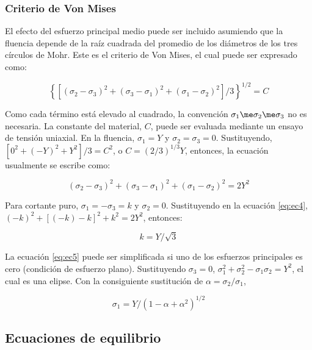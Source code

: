 \subsubsection{Criterio de Von Mises}

El efecto del esfuerzo principal medio puede ser incluido asumiendo que la fluencia depende de la raíz cuadrada 
del promedio de los diámetros de los tres círculos de Mohr. Este es el criterio de Von Mises, el cual puede ser 
expresado como:

\begin{equation} \label{eq:ec3}
\left\{ [(\sigma_2-\sigma_3)^2 + (\sigma_3-\sigma_1 )^2 + (\sigma_1-\sigma_2 )^2]/3 \right\}^{1/2} = C
\end{equation}

Como cada término está elevado al cuadrado, la convención $\sigma_1 \me \sigma_2 \me \sigma_3$ no es necesaria. 
La constante del material, $C$, puede ser evaluada mediante un ensayo de tensión uniaxial. En la fluencia, 
$\sigma_1 = Y$ y $\sigma_2 = \sigma_3 = 0$. Sustituyendo, $[0^2 + (-Y)^2 + Y^2]/3 = C^2$, o 
$C = (2/3)^{1/3} Y $, entonces, la ecuación usualmente se escribe como:

\begin{equation}\label{eq:ec4}
(\sigma_2-\sigma_3)^2 + (\sigma_3-\sigma_1 )^2 + (\sigma_1-\sigma_2 )^2 = 2Y^2
\end{equation}

Para cortante puro, $\sigma_1 = -\sigma_3 = k$ y $\sigma_2=0$. Sustituyendo en la ecuación \ref{eq:ec4}, 
$ (-k)^2 + [ (-k)-k ]^2 + k^2 = 2Y^2 $, entonces:

\begin{equation}\label{eq:ec5}
k = Y/\sqrt{3}
\end{equation}

La ecuación \ref{eq:ec5} puede ser simplificada si uno de los esfuerzos principales es cero (condición de esfuerzo plano). 
Sustituyendo $\sigma_3 = 0$, $\sigma_1^2 + \sigma_2^2 - \sigma_1 \sigma_2 = Y^2$, el cual es una elipse. Con la 
consiguiente sustitución de $\alpha = \sigma_2/\sigma_1$,

\begin{equation}
\sigma_1 = Y/(1-\alpha+\alpha^2)^{1/2}
\end{equation}


\subsection{Ecuaciones de equilibrio}

